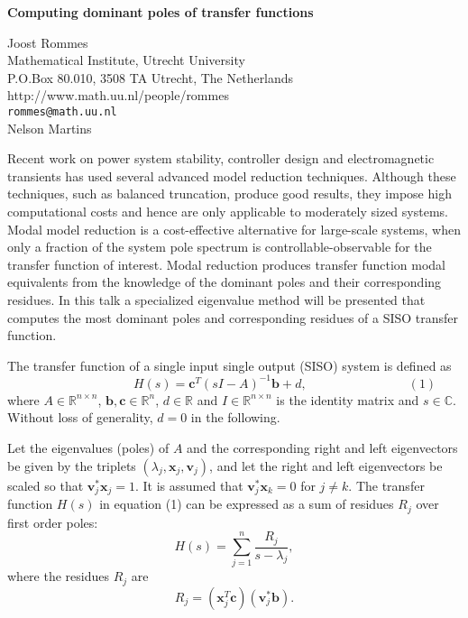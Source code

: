 \documentclass{report}
\newcommand{\Reals}{\mathbb{R}}
\newcommand{\Cplex}{\mathbb{C}}
\begin{document}

\begin{center}
{\large
{\bf Computing dominant poles of transfer functions}}

	Joost Rommes \\
	Mathematical Institute, Utrecht University \\
	P.O.Box 80.010, 3508 TA Utrecht, The Netherlands \\
	http://www.math.uu.nl/people/rommes \\
	{\tt rommes@math.uu.nl} \\
	Nelson Martins
\end{center}
Recent work on power system
stability, controller design and electromagnetic transients
has used several advanced model reduction techniques.
Although these techniques, such as balanced truncation,
produce good results, they impose high computational costs
and hence are only applicable to moderately sized systems.
Modal model reduction is a cost-effective alternative for
large-scale systems, when only a fraction of the system pole
spectrum is controllable-observable for the transfer
function of interest. Modal reduction produces transfer
function modal equivalents from the knowledge of the
dominant poles and their corresponding residues. In this
talk a specialized eigenvalue method will be presented that
computes the most dominant poles and corresponding residues
of a SISO transfer function.

The transfer function of a
single input single output (SISO) system is defined as
$$
\qquad
\qquad
\qquad
\qquad
H(s) = \mathbf{c}^T (sI - A)^{-1}\mathbf{b} + d,
\qquad
\qquad
\qquad
\qquad
(1)
$$
where
$A\in\Reals^{n\times n}$,
$\mathbf{b},\mathbf{c}\in\Reals^n$, $d\in\Reals$ and
$I\in\Reals^{n\times n}$ is the identity
matrix and $s\in\Cplex$.
Without loss of generality, $d=0$ in
the following.

Let the eigenvalues (poles) of $A$ and the
corresponding right and left eigenvectors be given by the
triplets $(\lambda_j,\mathbf{x}_j,\mathbf{v}_j)$,
and let the right and
left eigenvectors be scaled so that
$\mathbf{v}_j^*\mathbf{x}_j=1$.
It is
assumed that $\mathbf{v}_j^*\mathbf{x}_k=0$ for $j\neq k$.
The transfer function $H(s)$ in equation (1)
can be expressed as a
sum of residues $R_j$ over first order poles:
$$
H(s) = \sum_{j=1}^n
\frac{R_j}{s - \lambda_j},
$$
where the residues $R_j$ are
$$
R_j = (\mathbf{x}_j^T\mathbf{c})(\mathbf{v}_j^*\mathbf{b}).
$$
\end{document}
